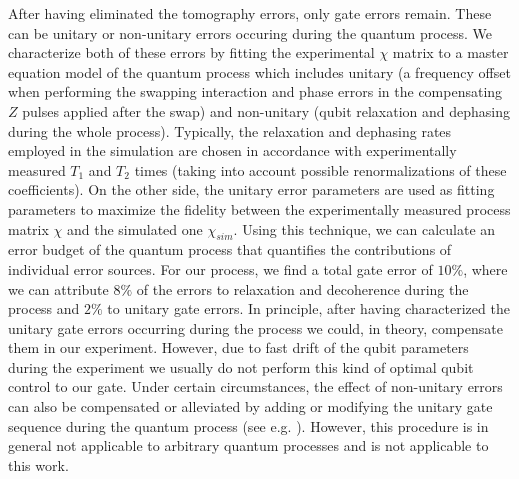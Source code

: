After having eliminated the tomography errors, only gate errors remain. These can be unitary or non-unitary errors occuring during the quantum process. We characterize both of these errors by fitting the experimental $\chi$ matrix to a master equation model of the quantum process which includes unitary (a frequency offset when performing the swapping interaction and phase errors in the compensating $Z$ pulses applied after the swap) and non-unitary (qubit relaxation and dephasing during the whole process). Typically, the relaxation and dephasing rates employed in the simulation are chosen in accordance with experimentally measured $T_1$ and $T_2$ times (taking into account possible renormalizations of these coefficients). On the other side, the unitary error parameters are used as fitting parameters to maximize the fidelity between the experimentally measured process matrix $\chi$ and the simulated one $\chi_{sim}$. Using this technique, we can calculate an error budget of the quantum process that quantifies the contributions of individual error sources. For our process, we find a total gate error of $10 \%$, where we can attribute $8\%$ of the errors to relaxation and decoherence during the process and $2\%$ to unitary gate errors. In principle, after having characterized the unitary gate errors occurring during the process we could, in theory, compensate them in our experiment. However, due to fast drift of the qubit parameters during the experiment we usually do not perform this kind of optimal qubit control to our gate. Under certain circumstances, the effect of non-unitary errors can also be compensated or alleviated by adding or modifying the unitary gate sequence during the quantum process (see e.g. \citep{lange_universal_2010}). However, this procedure is in general not applicable to arbitrary quantum processes and is not applicable to this work.

